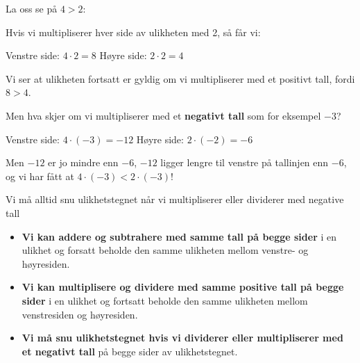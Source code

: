 \documentclass[
  letterpaper,
  DIV=11,
  numbers=noendperiod]{scrartcl}
\theoremstyle{definition}
\theoremstyle{definition}
\theoremstyle{remark}
\begin{document}
\begin{tcolorbox}[enhanced jigsaw, colframe=quarto-callout-important-color-frame, title={Men hva med multiplikasjon og divisjon?}, left=2mm, bottomtitle=1mm, coltitle=black, toprule=.15mm, leftrule=.75mm, opacityback=0, rightrule=.15mm, opacitybacktitle=0.6, breakable, toptitle=1mm, titlerule=0mm, arc=.35mm, bottomrule=.15mm, colbacktitle=quarto-callout-important-color!10!white, colback=white]

La oss se på \(4 > 2\):

Hvis vi multipliserer hver side av ulikheten med 2, så får vi:

Venstre side: \(4\cdot 2 = 8\) Høyre side: \(2\cdot 2 = 4\)

Vi ser at ulikheten fortsatt er gyldig om vi multipliserer med et
positivt tall, fordi \(8>4\).

Men hva skjer om vi multipliserer med et \textbf{negativt tall} som for
eksempel \(-3\)?

Venstre side: \(4\cdot(-3)=-12\) Høyre side: \(2\cdot(-2)=-6\)

Men \(-12\) er jo mindre enn \(-6\), \(-12\) ligger lengre til venstre
på tallinjen enn \(-6\), og vi har fått at \(4\cdot(-3)<2\cdot(-3)\)!

\end{tcolorbox}

\begin{tcolorbox}[enhanced jigsaw, colframe=quarto-callout-note-color-frame, title=\textcolor{quarto-callout-note-color}{\faInfo}\hspace{0.5em}{Multiplikasjon og divisjon med negative tall}, left=2mm, bottomtitle=1mm, coltitle=black, toprule=.15mm, leftrule=.75mm, opacityback=0, rightrule=.15mm, opacitybacktitle=0.6, breakable, toptitle=1mm, titlerule=0mm, arc=.35mm, bottomrule=.15mm, colbacktitle=quarto-callout-note-color!10!white, colback=white]

Vi må alltid snu ulikhetstegnet når vi multipliserer eller dividerer med
negative tall

\end{tcolorbox}

\begin{itemize}
\item
  \textbf{Vi kan addere og subtrahere med samme tall på begge sider} i
  en ulikhet og forsatt beholde den samme ulikheten mellom venstre- og
  høyresiden.
\item
  \textbf{Vi kan multiplisere og dividere med samme positive tall på
  begge sider} i en ulikhet og fortsatt beholde den samme ulikheten
  mellom venstresiden og høyresiden.
\item
  \textbf{Vi må snu ulikhetstegnet hvis vi dividerer eller multipliserer
  med et negativt tall} på begge sider av ulikhetstegnet.
\end{itemize}
\end{document}

